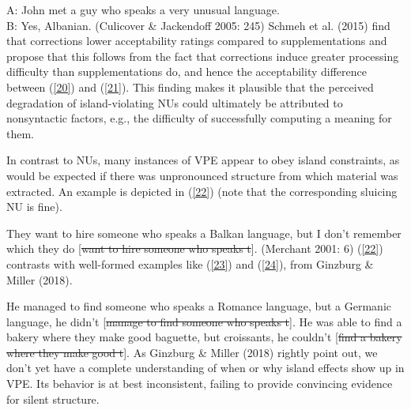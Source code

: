 \documentclass[output=paper
                ,modfonts
                ,nonflat
	        ,collection
	        ,collectionchapter
	        ,collectiontoclongg
 	        ,biblatex
                ,babelshorthands
                ,newtxmath
                ,draftmode
                ,colorlinks, citecolor=brown
]{./langsci/langscibook}
\begin{document}
{\ea A: John met a guy who speaks a very unusual language. \\B: Yes, Albanian. (Culicover \& Jackendoff 2005: 245) \label{21}\z
Schmeh et al. (2015) find that corrections lower acceptability ratings compared to supplementations and propose that this follows from the fact that corrections induce greater processing difficulty than supplementations do, and hence the acceptability difference between (\ref{20}) and (\ref{21}). This finding makes it plausible that the perceived degradation of island-violating NUs could ultimately be attributed to nonsyntactic factors, e.g., the difficulty of successfully computing a meaning for them.

In contrast to NUs, many instances of VPE appear to obey island constraints, as would be expected if there was unpronounced structure from which material was extracted. An example is depicted in (\ref{22}) (note that the corresponding sluicing NU is fine).

\ea *They want to hire someone who speaks a Balkan language, but I don't remember which they do [\sout{want to hire someone who speaks t}]. (Merchant
2001: 6)\label{22}\z
(\ref{22}) contrasts with well-formed examples like (\ref{23}) and (\ref{24}), from Ginzburg \& Miller (2018).

\ea He managed to find someone who speaks a Romance language, but a Germanic language, he didn't [\sout{manage to find someone who speaks t}].\label{23}\z
\ea He was able to find a bakery where they make good baguette, but croissants, he couldn't [\sout{find a bakery where they make good t}].\label{24}\z
As Ginzburg \& Miller (2018) rightly point out, we don't yet have a complete understanding of when or why island effects show up in VPE. Its behavior is at best inconsistent, failing to provide convincing evidence for silent structure.


}
\end{document}
